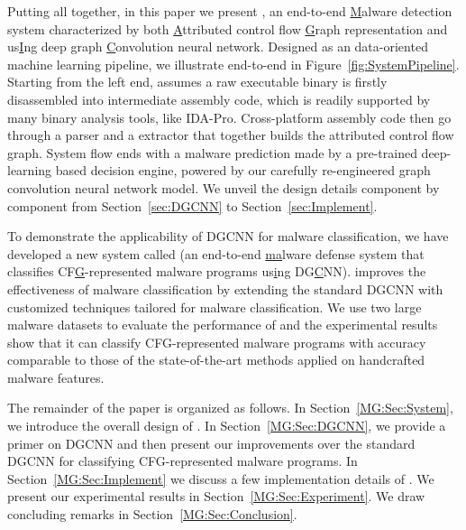 Putting all together, in this paper we present \sysname,
an end-to-end \underline{M}alware detection system characterized by both \underline{A}ttributed control flow \underline{G}raph representation and
us\underline{I}ng deep graph \underline{C}onvolution neural network.
Designed as an data-oriented machine learning pipeline, we illustrate \sysname end-to-end in Figure~\ref{fig:SystemPipeline}.
Starting from the left end, \sysname assumes a raw executable binary is firstly disassembled into intermediate assembly code,
which is readily supported by many binary analysis tools, like IDA-Pro.
Cross-platform assembly code then go through a parser and a extractor that together builds the attributed control flow graph.
System flow ends with a malware prediction made by a pre-trained deep-learning based decision engine,
powered by our carefully re-engineered graph convolution neural network model.
We unveil the design details component by component from Section~\ref{sec:DGCNN} to Section~\ref{sec:Implement}.
\fi

To demonstrate the applicability of DGCNN for malware classification,
we have developed a new system called \sysname (an end-to-end \underline{ma}lware defense system that classifies CF\underline{G}-represented malware programs us\underline{i}ng DG\underline{C}NN).
\sysname improves the effectiveness of malware classification by extending the standard DGCNN with customized techniques tailored for malware classification.
We use two large malware datasets to evaluate the performance of \sysname and the experimental results show that it can classify CFG-represented malware programs with accuracy comparable to those of the state-of-the-art methods applied on handcrafted malware features.

The remainder of the paper is organized as follows.
In Section~\ref{MG:Sec:System}, we introduce the overall design of \sysname.
In Section~\ref{MG:Sec:DGCNN}, we provide a primer on DGCNN and then present our improvements over the standard DGCNN for classifying CFG-represented malware programs.
In Section~\ref{MG:Sec:Implement} we discuss a few implementation details of \sysname.
We present our experimental results in Section~\ref{MG:Sec:Experiment}.
We draw concluding remarks in Section~\ref{MG:Sec:Conclusion}.

